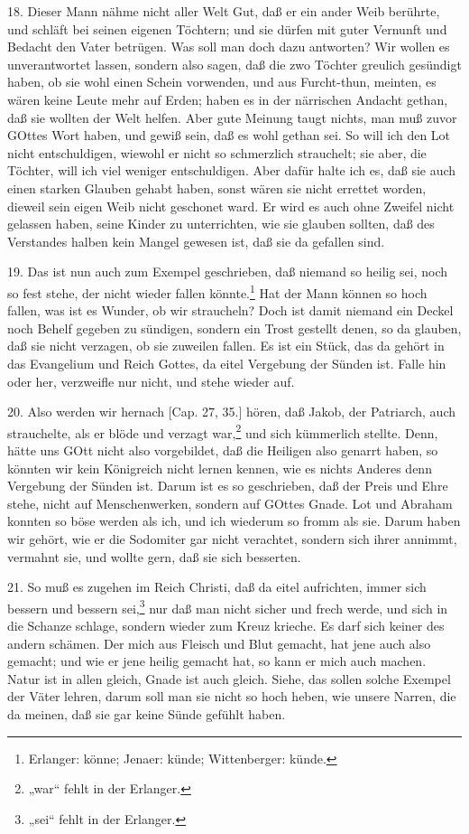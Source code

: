 18. Dieser Mann nähme nicht aller Welt Gut, daß er ein ander Weib berührte, und schläft bei seinen eigenen Töchtern; und sie dürfen mit guter Vernunft und Bedacht den Vater betrügen. Was soll man doch dazu antworten? Wir wollen es unverantwortet lassen, sondern also sagen, daß die zwo Töchter greulich gesündigt haben, ob sie wohl einen Schein vorwenden, und aus Furcht-thun, meinten, es wären keine Leute mehr auf Erden; haben es in der närrischen Andacht gethan, daß sie wollten der Welt helfen. Aber gute Meinung taugt nichts, man muß zuvor GOttes Wort haben, und gewiß sein, daß es wohl gethan sei. So will ich den Lot nicht entschuldigen, wiewohl er nicht so schmerzlich strauchelt; sie aber, die Töchter, will ich viel weniger entschuldigen. Aber dafür halte ich es, daß sie auch einen starken Glauben gehabt haben, sonst wären sie nicht errettet worden, dieweil sein eigen Weib nicht geschonet ward. Er wird es auch ohne Zweifel nicht gelassen haben, seine Kinder zu unterrichten, wie sie glauben sollten, daß des Verstandes halben kein Mangel gewesen ist, daß sie da gefallen sind.

19. Das ist nun auch zum Exempel geschrieben, daß niemand so heilig sei, noch so fest stehe, der nicht wieder fallen könnte.\footnote{Erlanger: könne; Jenaer: künde; Wittenberger: künde.} Hat der Mann können so hoch fallen, was ist es Wunder, ob wir straucheln? Doch ist damit niemand ein Deckel noch Behelf gegeben zu sündigen, sondern ein Trost gestellt denen, so da glauben, daß sie nicht verzagen, ob sie zuweilen fallen. Es ist ein Stück, das da gehört in das Evangelium und Reich Gottes, da eitel Vergebung der Sünden ist. Falle hin oder her, verzweifle nur nicht, und stehe wieder auf.

20. Also werden wir hernach [Cap. 27, 35.] hören, daß Jakob, der Patriarch, auch strauchelte, als er blöde und verzagt war,\footnote{„war“ fehlt in der Erlanger.} und sich kümmerlich stellte. Denn, hätte uns GOtt nicht also vorgebildet, daß die Heiligen also genarrt haben, so könnten wir kein Königreich nicht lernen kennen, wie es nichts Anderes denn Vergebung der Sünden ist. Darum ist es so geschrieben, daß der Preis und Ehre stehe, nicht auf Menschenwerken, sondern auf GOttes Gnade. Lot und Abraham konnten so böse werden als ich, und ich wiederum so fromm als sie. Darum haben wir gehört, wie er die Sodomiter gar nicht verachtet, sondern sich ihrer annimmt, vermahnt sie, und wollte gern, daß sie sich besserten.

21. So muß es zugehen im Reich Christi, daß da eitel aufrichten, immer sich bessern und bessern sei,\footnote{„sei“ fehlt in der Erlanger.} nur daß man nicht sicher und frech werde, und sich in die Schanze schlage, sondern wieder zum Kreuz krieche. Es darf sich keiner des andern schämen. Der mich aus Fleisch und Blut gemacht, hat jene auch also gemacht; und wie er jene heilig gemacht hat, so kann er mich auch machen. Natur ist in allen gleich, Gnade ist auch gleich. Siehe, das sollen solche Exempel der Väter lehren, darum soll man sie nicht so hoch heben, wie unsere Narren, die da meinen, daß sie gar keine Sünde gefühlt haben.

